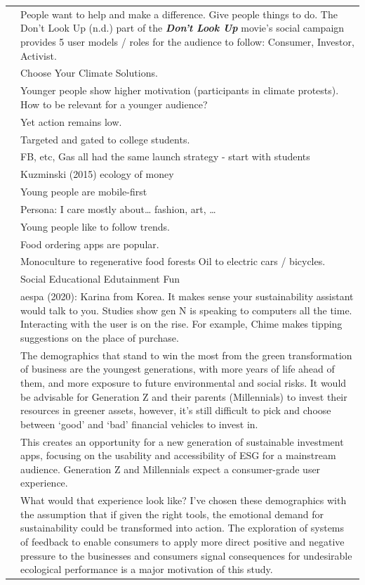 \documentclass[
  letterpaper,
  DIV=11,
  numbers=noendperiod]{scrartcl}
\begin{document}
\begin{longtable}[]{@{}
  >{\raggedright\arraybackslash}p{}
  >{\raggedright\arraybackslash}p{}@{}}
& People want to help and make a difference. Give people things to do.
The Don't Look Up (n.d.) part of the \textbf{\emph{Don't Look Up}}
movie's social campaign provides 5 user models / roles for the audience
to follow: Consumer, Investor, Activist. \\
& Choose Your Climate Solutions. \\
& Younger people show higher motivation (participants in climate
protests). How to be relevant for a younger audience? \\
& Yet action remains low. \\
& Targeted and gated to college students. \\
& FB, etc, Gas all had the same launch strategy - start with students \\
& Kuzminski (2015) ecology of money \\
& Young people are mobile-first \\
& Persona: I care mostly about\ldots{} fashion, art, \ldots{} \\
& Young people like to follow trends. \\
& Food ordering apps are popular. \\
& Monoculture to regenerative food forests Oil to electric cars /
bicycles. \\
& Social Educational Edutainment Fun \\
& aespa (2020): Karina from Korea. It makes sense your sustainability
assistant would talk to you. Studies show gen N is speaking to computers
all the time. Interacting with the user is on the rise. For example,
Chime makes tipping suggestions on the place of purchase. \\
& The demographics that stand to win the most from the green
transformation of business are the youngest generations, with more years
of life ahead of them, and more exposure to future environmental and
social risks. It would be advisable for Generation Z and their parents
(Millennials) to invest their resources in greener assets, however, it's
still difficult to pick and choose between `good' and `bad' financial
vehicles to invest in. \\
& This creates an opportunity for a new generation of sustainable
investment apps, focusing on the usability and accessibility of ESG for
a mainstream audience. Generation Z and Millennials expect a
consumer-grade user experience. \\
& What would that experience look like? I've chosen these demographics
with the assumption that if given the right tools, the emotional demand
for sustainability could be transformed into action. The exploration of
systems of feedback to enable consumers to apply more direct positive
and negative pressure to the businesses and consumers signal
consequences for undesirable ecological performance is a major
motivation of this study. \\
\end{longtable}
\end{document}

